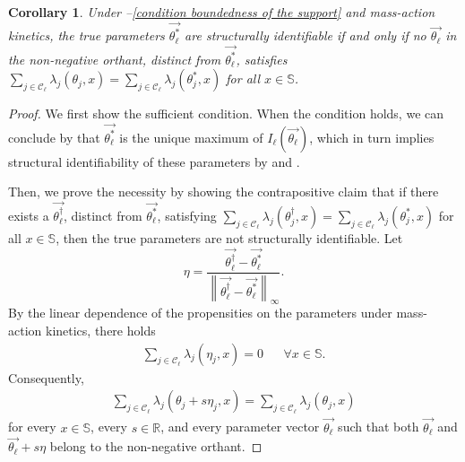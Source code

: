 \documentclass[pdflatex,sn-mathphys-num]{sn-jnl}%
\theoremstyle{thmstyleone}%
\newtheorem{corollary}[theorem]{Corollary}
\theoremstyle{thmstyletwo}%
\theoremstyle{thmstylethree}%
\begin{document}
\begin{appendices}
\begin{corollary}\label{corollary necessary and sufficient conditons for identifiability}
    Under --\ref{condition boundedness of the support} and mass-action kinetics, the true parameters $\overrightarrow{\theta^*_\ell}$ are structurally identifiable if and only if no $\overrightarrow{\theta_\ell}$ in the non-negative orthant, distinct from $\overrightarrow{\theta^*_\ell}$, satisfies
    $\sum_{j\in\mathcal C_\ell} \lambda_{j}(\theta_j,x) = \sum_{j\in\mathcal C_\ell} \lambda_{j}(\theta^*_j,x)$ for all $x\in\mathbb S$.
\end{corollary}

\begin{proof}
    We first show the sufficient condition. When the condition holds, we can conclude by  that $\overrightarrow{\theta^*_\ell}$ is the unique maximum of $I_\ell\left(\overrightarrow{\theta_\ell}\right)$, which in turn implies structural identifiability of these parameters by  and .

    Then, we prove the necessity by showing the contrapositive claim that if there exists a $\overrightarrow{\theta^{\dagger}_\ell}$, distinct from $\overrightarrow{\theta^*_\ell}$, satisfying
    $\sum_{j\in\mathcal C_\ell} \lambda_{j}(\theta^{\dagger}_j,x) = \sum_{j\in\mathcal C_\ell} \lambda_{j}(\theta^*_j,x)$ for all $x\in\mathbb S$, then the true parameters are not structurally identifiable.
    Let
    \[
        \eta = \frac{\overrightarrow{\theta^{\dagger}_\ell} - \overrightarrow{\theta^{*}_\ell}}{\left\|\overrightarrow{\theta^{\dagger}_\ell} - \overrightarrow{\theta^{*}_\ell}\right\|_{\infty}}.
    \]
    By the linear dependence of the propensities on the parameters under mass-action kinetics, there holds
    \begin{align}\label{eq. equivalent propensities in regions}
        \sum_{j\in\mathcal C_\ell} \lambda_{j}(\eta_j,x) = 0
        && \forall x\in\mathbb S.
    \end{align}
    Consequently,
    \begin{align}\label{eq. equivalent propensities in shifted regions}
        \sum_{j\in\mathcal C_\ell} \lambda_{j}(\theta_j + s\eta_j,x)
        = \sum_{j\in\mathcal C_\ell} \lambda_{j}(\theta_j,x)
    \end{align}
    for every $x\in\mathbb S$, every $s\in\mathbb R$, and every parameter vector $\overrightarrow{\theta_\ell}$ such that both $\overrightarrow{\theta_\ell}$ and $\overrightarrow{\theta_\ell} + s\eta$ belong to the non-negative orthant.


\end{proof}
\end{appendices}
\end{document}
